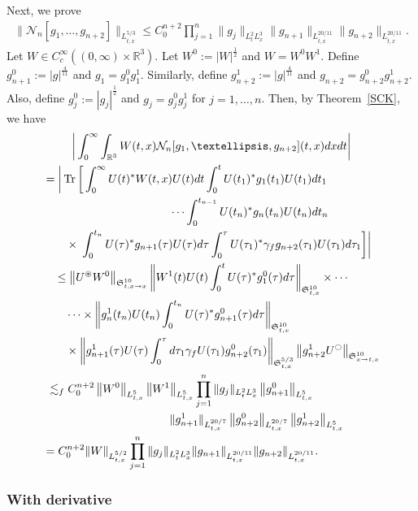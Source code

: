 \documentclass[10pt,a4paper]{amsart}
\providecommand{\No}[1]{\left\| #1 \right\|}
\newcommand{\oast}{\circledast}
\newcommand{\BR}{\mathbb{R}}
\newcommand{\CN}{\mathcal{N}}
\newcommand{\FS}{\mathfrak{S}}
\newcommand{\ga}{\gamma}
\newcommand{\ta}{\tau}
\renewcommand{\No}[1]{\left\| #1 \right\|}
\newcommand{\I}{\infty}
\DeclareMathOperator{\Tr}{Tr}
\newcommand{\tx}{{t,x}}
\newcommand{\R}{\mathbb{R}}
\newcommand{\tw}{\frac{1}{2}}
\newcommand{\oc}{\ocircle}
\newcommand{\os}{\oast}
\newcommand{\ls}{\lesssim}
\begin{document}
Next, we prove
\begin{align}\label{eq:no deriv II}
\|\CN_n[g_1,\dots,g_{n+2}]\|_{L^{5/3}_\tx}
\le C_0^{n+2} \prod_{j=1}^n
\|g_j\|_{L^{2}_t L^3_x}
\|g_{n+1}\|_{L^{20/11}_\tx} \|g_{n+2}\|_{L^{20/11}_\tx}.
\end{align}
Let $W \in C_c^\I((0,\I) \times \BR^3)$. Let $W^0 := |W|^\tw$ and $W=W^0 W^1$. Define $g_{n+1}^0 := |g|^{\frac{4}{11}}$ and $g_1 =g_1^0 g_1^1$. Similarly, define $g_{n+2}^1 := |g|^{\frac{4}{11}}$ and $g_{n+2} = g_{n+2}^0 g_{n+2}^1$. Also, define $g_j^0:= |g_j|^\tw$ and $g_j = g_j^0 g_j^1$ for $j=1,\dots,n$. Then, by Theorem~\ref{SCK}, we have
\begin{multline}
\bigg|\int_0^\I \int_{\R^3} W(t,x)\CN_n[g_1,\dots,g_{n+2}](t,x) dx dt \bigg| \\
\begin{aligned}
& = \bigg| \Tr \bigg[\int_0^\I U(t)^* W(t,x) U(t) dt
\int_0^t U(t_1)^* g_1(t_1) U(t_1)dt_1\\
&\mkern200mu
\cdots
\int_0^{t_{n-1}} U(t_n)^* g_n(t_n) U(t_n)dt_n\\
& \qquad \times\left. \left.
\int_0^{t_n} U(\ta)^* g_{n+1}(\ta) U(\ta)d\ta
\int_0^\ta U(\ta_1)^* \ga_f g_{n+2}(\ta_1) U(\ta_1)d\ta_1 \right] \right| \\
&\quad \le \left\|U^\os W^0\right\|_{\FS^{10}_{\tx \to x}}
\No{W^1(t)U(t)\int_0^t U(\ta)^* g_1^0(\ta) d\ta }_{\FS^{10}_\tx}
\times \cdots \\
&\qquad \cdots \times
\No{g_n^1(t_n)U(t_n)\int_0^{t_n} U(\ta)^* g_{n+1}^0(\ta) d\ta }_{\FS^{10}_\tx} \\
&\qquad \times
\No{g_{n+1}^1(\ta)U(\ta) \int_0^\ta d\ta_1 \ga_f U(\ta_1) g_{n+2}^0(\ta_1)}_{\FS^{5/3}_\tx}
\left\|g_{n+2}^1 U^\oc\right\|_{\FS^{10}_{x\to \tx}} \\
&\ \ls_f C_0^{n+2} \left\|W^0\right\|_{L^5_\tx} \left\|W^1\right\|_{L^5_\tx}
\prod_{j=1}^n \|g_j\|_{L^2_t L^3_x}
\left\|g_{n+1}^0\right\|_{L^5_\tx}\\
&\mkern200mu\|g_{n+1}^1\|_{L^{20/7}_\tx}
\left\|g_{n+2}^0\right\|_{L^{20/7}_\tx}
\left\|g_{n+2}^1\right\|_{L^5_\tx}\\
& = C_0^{n+2}
\|W\|_{L^{5/2}_\tx}
\prod_{j=1}^{n} \|g_j\|_{L^2_t L^3_x}
\|g_{n+1}\|_{L^{20/11}_\tx}
\|g_{n+2}\|_{L^{20/11}_\tx}.
\end{aligned}
\end{multline}

\subsubsection{With derivative} 
\end{document}
